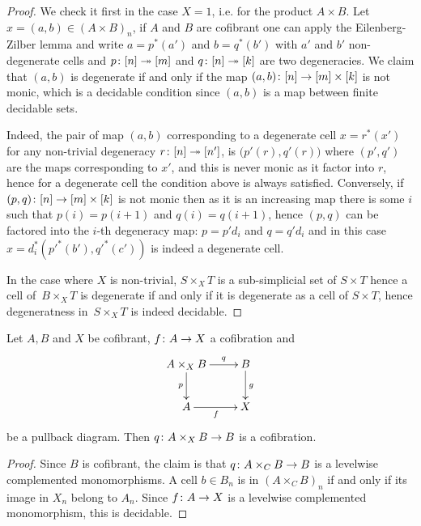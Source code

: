 \documentclass[reqno,10pt,a4paper,oneside,draft]{amsart}
\begin{document}
\begin{proof}
We check it first in the case $X = 1$, i.e. for the product $A \times B$. Let $x = (a,b) \in (A \times B)_n$, if $A$ and $B$ are cofibrant one can apply the Eilenberg-Zilber lemma and write $a = p^*(a')$ and $b = q^*(b')$ with $a'$ and $b'$ non-degenerate cells and $p \colon [n] \twoheadrightarrow [m]$ and $q \colon [n] \twoheadrightarrow [k]$ are two degeneracies. We claim that $(a,b)$ is degenerate if and only if the map $(a ,b )  \colon [n] \rightarrow [m] \times [k]$ is not monic, which is a decidable condition since $(a,b)$ is a map between finite decidable sets.

Indeed, the pair of map $(a,b)$ corresponding to a degenerate cell $x=r^*(x')$ for any non-trivial degeneracy $r \colon [n] \twoheadrightarrow [n']$, is  $\big( p'(r),q'(r) \big)$ where $(p',q')$ are the maps corresponding to $x'$, and this is never monic as it factor into $r$, hence for a degenerate cell the condition above is always satisfied. Conversely, if $(p,q)\colon [n] \rightarrow [m] \times [k]$ is not monic then as it is an increasing map there is some $i$ such that $p(i)=p(i+1)$ and $q(i)=q(i+1)$, hence $(p,q)$ can be factored into the $i$-th degeneracy map: $p=p' d_i$ and $q=q' d_i$ and in this case $x= d_i^* (p'^*(b'),q'^*(c'))$ is indeed a degenerate cell.


In the case where $X$ is non-trivial, $S \times_X T$ is a sub-simplicial set of $S \times T$ hence a cell of~$B \times_X T$ is degenerate if and only if it is degenerate as a cell of $S \times T$, hence degeneratness 
in~$S \times_X T$ is indeed decidable. 
\end{proof}


\begin{proposition} \label{thm:cof-pbk} Let $A ,B$ and $X$ be cofibrant, $f \colon A \rightarrow X$ a cofibration and
\[
\xymatrix{
A \times_X B \ar[r]^-{q} \ar[d]_-{p} &  B \ar[d]^g \\
A \ar[r]_f & X}
\]
be a pullback diagram. Then $q \colon A \times_X B \rightarrow B$ is a cofibration.
\end{proposition}

\begin{proof} Since $B$ is cofibrant, the claim is that $q \colon A \times_C B \rightarrow B$ is a levelwise complemented monomorphisms. A cell $b \in B_n$ is in  $(A \times_C B)_n$ if and only if its image in $X_n$ belong to $A_n$. Since $f \colon A \rightarrow X$ is a levelwise complemented monomorphism, this is decidable.
\end{proof} 
\end{document}
